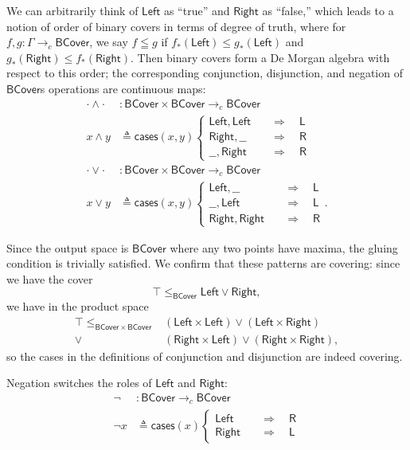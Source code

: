 \documentclass[conference]{IEEEtran}
\newcommand{\cto}{\to_c}
\newcommand{\Branch}{\Rightarrow}
\begin{document}
We can arbitrarily think of $\mathsf{Left}$ as ``true'' and $\mathsf{Right}$ as ``false,'' which leads to a notion of order of binary covers in terms of degree of truth, where for $f, g : \Gamma \cto \mathsf{BCover}$, we say $f \leqq g$ if $f_*(\mathsf{Left}) \le g_*(\mathsf{Left})$ and $g_*(\mathsf{Right}) \le f_*(\mathsf{Right})$. Then binary covers form a De Morgan algebra with respect to this order; the corresponding conjunction, disjunction, and negation of $\mathsf{BCover}$s operations are continuous maps:
\begin{align*}
\cdot \wedge \cdot &: \mathsf{BCover} \times \mathsf{BCover} \cto \mathsf{BCover}
\\ x \wedge y &\triangleq \mathsf{cases}(x, y)
\begin{cases}
\mathsf{Left}, \mathsf{Left}
 \quad &\Branch \quad
 \mathsf{L}
\\
\mathsf{Right}, \_\_
 \quad &\Branch \quad
 \mathsf{R}
\\
\_\_, \mathsf{Right}
 \quad &\Branch \quad
 \mathsf{R}
\end{cases}
\\
\cdot \vee \cdot &: \mathsf{BCover} \times \mathsf{BCover} \cto \mathsf{BCover}
\\ x \vee y &\triangleq \mathsf{cases}(x, y)
\begin{cases}
\mathsf{Left}, \_\_
 \quad &\Branch \quad
 \mathsf{L}
\\
\_\_, \mathsf{Left}
 \quad &\Branch \quad
 \mathsf{L}
\\
 \mathsf{Right}, \mathsf{Right}
 \quad &\Branch \quad
 \mathsf{R}
\end{cases}.
\end{align*}

Since the output space is $\mathsf{BCover}$ where any two points have maxima, the gluing condition is trivially satisfied. We confirm that these patterns are covering: since we have the cover
\[
\top \le_\mathsf{BCover} \mathsf{Left} \vee \mathsf{Right},
\]
we have in the product space
\begin{align*}
\top \le_{\mathsf{BCover} \times \mathsf{BCover}} 
  &(\mathsf{Left} \times \mathsf{Left}) \vee (\mathsf{Left} \times \mathsf{Right})
\\ \vee &(\mathsf{Right} \times \mathsf{Left}) \vee (\mathsf{Right} \times \mathsf{Right}),
\end{align*}
so the cases in the definitions of conjunction and disjunction are indeed covering.

Negation switches the roles of $\mathsf{Left}$ and $\mathsf{Right}$:
\begin{align*}
 \neg &: \mathsf{BCover} \cto \mathsf{BCover}
\\ \neg x &\triangleq \mathsf{cases}(x)
\begin{cases}
\mathsf{Left}
 \quad &\Branch \quad
 \mathsf{R}
\\
\mathsf{Right}
 \quad &\Branch \quad
 \mathsf{L}
\end{cases}
\end{align*}
\end{document}
